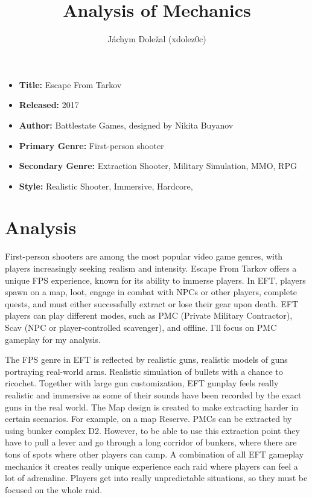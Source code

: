 \documentclass[a4paper,10pt,english]{article}
\title{%
Analysis of Mechanics%
}
\author{%
Jáchym Doležal (xdolez0c)%
}
\date{}
\begin{document}
\maketitle
\thispagestyle{empty}

{%
\large

\begin{itemize}

\item[] \textbf{Title:} Escape From Tarkov

\item[] \textbf{Released:} 2017

\item[] \textbf{Author:} Battlestate Games, designed by Nikita Buyanov

\item[] \textbf{Primary Genre:} First-person shooter\



\item[] \textbf{Secondary Genre:} Extraction Shooter, Military Simulation, MMO, RPG

\item[] \textbf{Style:} Realistic Shooter, Immersive, Hardcore, 

\end{itemize}

}

\section*{\centering Analysis}

First-person shooters are among the most popular video game genres, with players increasingly seeking realism and intensity. Escape From Tarkov offers a unique FPS experience, known for its ability to immerse players. In EFT, players spawn on a map, loot, engage in combat with NPCs or other players, complete quests, and must either successfully extract or lose their gear upon death. EFT players can play different modes, such as PMC (Private Military Contractor), Scav (NPC or player-controlled scavenger), and offline. I'll focus on PMC gameplay for my analysis.

The FPS genre in EFT is reflected by realistic guns, realistic models of guns portraying real-world arms. Realistic simulation of bullets with a chance to ricochet. Together with large gun customization, EFT gunplay feels really realistic and immersive as some of their sounds have been recorded by the exact guns in the real world. The Map design is created to make extracting harder in certain scenarios. For example, on a map Reserve. PMCs can be extracted by using bunker complex D2. However, to be able to use this extraction point they have to pull a lever and go through a long corridor of bunkers, where there are tons of spots where other players can camp. A combination of all EFT gameplay mechanics it creates really unique experience each raid where players can feel a lot of adrenaline. Players get into really unpredictable situations, so they must be focused on the whole raid. 
\end{document}
